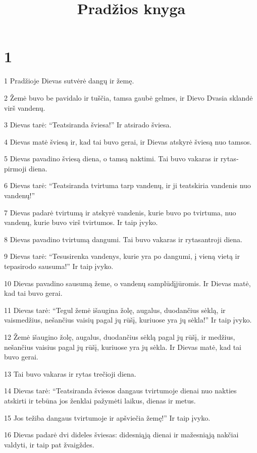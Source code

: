 

\title{Pradžios knyga}


\chapter{1}


\par 1 Pradžioje Dievas sutvėrė dangų ir žemę. 
\par 2 Žemė buvo be pavidalo ir tuščia, tamsa gaubė gelmes, ir Dievo Dvasia sklandė virš vandenų. 
\par 3 Dievas tarė: “Teatsiranda šviesa!” Ir atsirado šviesa. 
\par 4 Dievas matė šviesą ir, kad tai buvo gerai, ir Dievas atskyrė šviesą nuo tamsos. 
\par 5 Dievas pavadino šviesą diena, o tamsą naktimi. Tai buvo vakaras ir rytas­ pirmoji diena. 
\par 6 Dievas tarė: “Teatsiranda tvirtuma tarp vandenų, ir ji teatskiria vandenis nuo vandenų!” 
\par 7 Dievas padarė tvirtumą ir atskyrė vandenis, kurie buvo po tvirtuma, nuo vandenų, kurie buvo virš tvirtumos. Ir taip įvyko. 
\par 8 Dievas pavadino tvirtumą dangumi. Tai buvo vakaras ir rytas­antroji diena. 
\par 9 Dievas tarė: “Tesusirenka vandenys, kurie yra po dangumi, į vieną vietą ir tepasirodo sausuma!” Ir taip įvyko. 
\par 10 Dievas pavadino sausumą žeme, o vandenų samplūdį­jūromis. Ir Dievas matė, kad tai buvo gerai. 
\par 11 Dievas tarė: “Tegul žemė išaugina žolę, augalus, duodančius sėklą, ir vaismedžius, nešančius vaisių pagal jų rūšį, kuriuose yra jų sėkla!” Ir taip įvyko. 
\par 12 Žemė išaugino žolę, augalus, duodančius sėklą pagal jų rūšį, ir medžius, nešančius vaisius pagal jų rūšį, kuriuose yra jų sėkla. Ir Dievas matė, kad tai buvo gerai. 
\par 13 Tai buvo vakaras ir rytas­ trečioji diena. 
\par 14 Dievas tarė: “Teatsiranda šviesos dangaus tvirtumoje dienai nuo nakties atskirti ir tebūna jos ženklai pažymėti laikus, dienas ir metus. 
\par 15 Jos težiba dangaus tvirtumoje ir apšviečia žemę!” Ir taip įvyko. 
\par 16 Dievas padarė dvi dideles šviesas: didesniąją­ dienai ir mažesniąją nakčiai valdyti, ir taip pat žvaigždes. 
